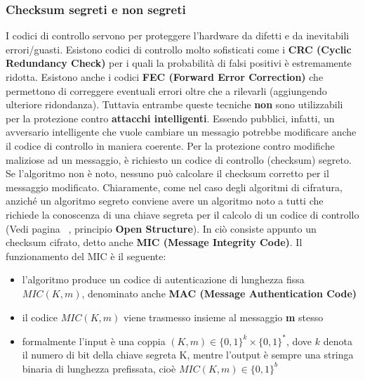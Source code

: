 \subsubsection{Checksum segreti e non segreti}
I codici di controllo servono per proteggere l’hardware da difetti e da inevitabili errori/guasti. Esistono codici di controllo molto sofisticati come i \textbf{CRC (Cyclic Redundancy Check)} per i quali la probabilità di falsi positivi è estremamente ridotta. Esistono anche i codici \textbf{FEC (Forward Error Correction)} che permettono di correggere eventuali errori oltre che a rilevarli (aggiungendo ulteriore ridondanza). Tuttavia entrambe queste tecniche \textbf{non} sono utilizzabili per la protezione contro \textbf{attacchi intelligenti}. Essendo pubblici, infatti, un avversario intelligente che vuole cambiare un messagio potrebbe modificare anche il codice di controllo in maniera coerente.\newline \newline
Per la protezione contro modifiche maliziose ad un messaggio, è richiesto un codice di controllo (checksum) segreto. Se l'algoritmo non è noto, nessuno può calcolare il checksum corretto per il messaggio modificato. Chiaramente, come nel caso degli algoritmi di cifratura, anziché un
algoritmo segreto conviene avere un algoritmo noto a tutti che richiede la conoscenza di una chiave segreta per il calcolo di un codice di controllo (Vedi pagina ~\pageref{sec:openStruct}, principio \textbf{Open Structure}). \newline \newline
In ciò consiste appunto un checksum cifrato, detto anche \textbf{MIC (Message Integrity Code)}. Il funzionamento del MIC è il seguente:
\begin{itemize}
  \item l'algoritmo produce un codice di autenticazione di lunghezza fissa $MIC(K,m)$, denominato anche \textbf{MAC (Message Authentication Code)}
  \item il codice $MIC(K,m)$ viene trasmesso insieme al messaggio \textbf{m} stesso
  \item formalmente l’input è una coppia $(K,m) \in \{0, 1\}^k \times \{0, 1\}^*$, dove $k$ denota il numero di bit della chiave segreta K, mentre l'output è sempre una stringa binaria di lunghezza prefissata, cioè $MIC(K,m) \in \{0, 1\}^b$
\end{itemize}

